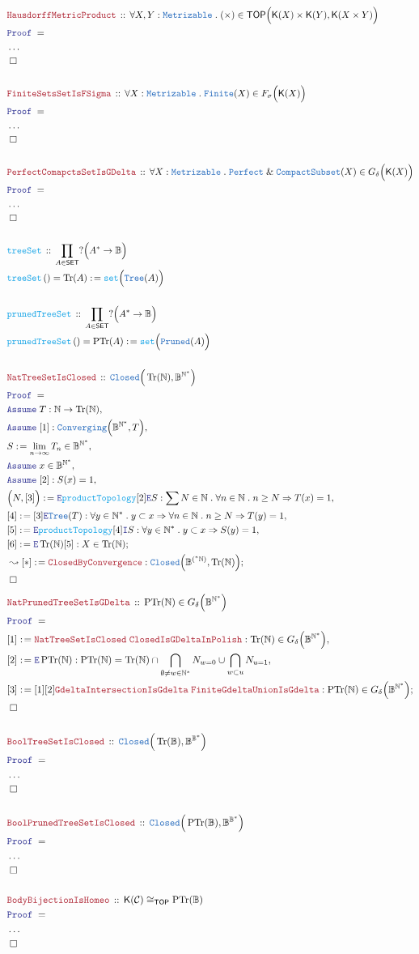 \documentclass[12pt]{scrartcl}
\newcommand{\TYPE}[1]{\textcolor{NavyBlue}{\mathtt{#1}}}
\newcommand{\FUNC}[1]{\textcolor{Cerulean}{\mathtt{#1}}}
\newcommand{\LOGIC}[1]{\textcolor{Blue}{\mathtt{#1}}}
\newcommand{\THM}[1]{\textcolor{Maroon}{\mathtt{#1}}}
\renewcommand{\.}{\; . \;}
\newcommand{\de}{: \kern 0.1pc =}
\newcommand{\Act}[1]{\left( #1 \right)}
\newcommand{\Theorem}[2]{& \THM{#1} \, :: \, #2 \\ & \Proof = \\ }
\newcommand{\DeclareFunc}[2]{& \FUNC{#1} \, :: \, #2 \\}
\newcommand{\DefineNamedFunc}[4]{&  \FUNC{#1}\Act{#2} = #3 \de #4 \\}
\newcommand{\Page}[1]{ \begin{align*} #1 \end{align*}   }
\newcommand{\NoProof}{ & \ldots \\ \EndProof}
\renewcommand{\And}{\; \& \;}
\newcommand{\Imply}{\Rightarrow}
\newcommand{\Intro}{\LOGIC{I}}
\newcommand{\Elim}{\LOGIC{E}}
\newcommand{\Nat}{\mathbb{N} }
\newcommand{\Say}[3]{& #1 \de #2 : #3, \\}
\newcommand{\SayIn}[3]{& #1 \de #2 \in #3, \\}
\newcommand{\Conclude}[3]{& #1 \de #2 : #3; \\}
\newcommand{\DeriveConclude}[3]{& \leadsto #1 \de #2 : #3 ; \\}
\newcommand{\Assume}[2]{& \LOGIC{Assume} \; #1 : #2, \\}
\newcommand{\AssumeIn}[2]{& \LOGIC{Assume} \; #1 \in #2, \\}
\newcommand{\QED}{\; \square}
\newcommand{\EndProof}{& \QED \\}
\newcommand{\Proof}{\LOGIC{Proof} \; }
\newcommand{\C}{\mathcal{C}}
\newcommand{\SET}{\mathsf{SET}}
\newcommand{\Compacts}{\TYPE{CompactSubset}}
\newcommand{\TOP}{\mathsf{TOP}}
\newcommand{\Bool}{\mathbb{B}}
\newcommand{\FS}[1]{{#1}{}^*}
\newcommand{\Tree}{\TYPE{Tree}}
\DeclareMathOperator{\Tr}{Tr}
\DeclareMathOperator{\PTr}{PTr}
\newcommand{\K}{\mathsf{K}}
\begin{document}
\Page{
	\Theorem{HausdorffMetricProduct}
	{
		\forall X,Y : \TYPE{Metrizable} \.
		(\times) \in \TOP\Big( \K(X) \times \K(Y), \K(X \times Y) \Big)
	}
	\NoProof
	\\
	\Theorem{FiniteSetsSetIsFSigma}
	{
		\forall X : \TYPE{Metrizable} \.
		\TYPE{Finite}(X) \in F_\sigma\Big( \K(X) \Big)
	}
	\NoProof
	\\
	\Theorem{PerfectComapctsSetIsGDelta}
	{
		\forall X : \TYPE{Metrizable} \.
		\TYPE{Perfect} \And \Compacts(X) \in G_\delta\Big( \K(X) \Big)
	}
	\NoProof
	\\
	\DeclareFunc{treeSet}{\prod_{A \in \SET} ?\Big(\FS{A}\to\mathbb{B}\Big)}
	\DefineNamedFunc{treeSet}{}{\Tr(A)}{\FUNC{set}\Big( \Tree(A) \Big)}
	\\
	\DeclareFunc{prunedTreeSet}{\prod_{A \in \SET} ?\Big(\FS{A}\to\mathbb{B}\Big)}
	\DefineNamedFunc{prunedTreeSet}{}{\PTr(A)}{\FUNC{set}\Big( \TYPE{Pruned}(A) \Big)}
	\\
	\Theorem{NatTreeSetIsClosed}{\TYPE{Closed}\Big( \Tr(\Nat), \mathbb{B}^{\FS{\Nat}}\Big)}
	\Assume{T}{\Nat \to \Tr(\Nat)}
	\Assume{[1]}{\TYPE{Converging}\Big( \Bool^{\FS{\Nat}} ,T \Big)}
	\SayIn{S}{\lim_{n \to \infty} T_n}{\Bool^{\FS{\Nat}}}
	\AssumeIn{x}{\Bool^{\FS{\Nat}}}
	\Assume{[2]}{S(x) = 1}
	\Say{\Big(N,[3]\Big)}
	{ \Elim \FUNC{productTopology}[2] \Elim S  }
	{
		\sum N \in \Nat \. \forall n \in \Nat \. n \ge N \Imply T(x) = 1
	}
	\Say{[4]}{[3]\Elim \Tree(T)}{ 
		\forall y \in \FS{\Nat} \. 
		y \subset x \Imply
		\forall n \in \Nat \. 
		n \ge N \Imply T(y) = 1
	}
	\Say{[5]}{\Elim \FUNC{productTopology}[4]\Intro S}
	{
		\forall y \in \FS{\Nat} \. y \subset x \Imply  S(y) = 1
	}
	\Conclude{[6]}{\Elim \Tr(\Nat)[5]}{X \in \Tr(\Nat)}
	\DeriveConclude{[*]}{\THM{ClosedByConvergence}}{\TYPE{Closed}\Big(\Bool^{\FS(\Nat)}, \Tr(\Nat) \Big)}
	\EndProof
}
\Page{
	\Theorem{NatPrunedTreeSetIsGDelta}
	{
		\PTr(\Nat) \in G_\delta\Big( \Bool^{\FS{\Nat}} \Big) 
	}
	\Say{[1]}{\THM{NatTreeSetIsClosed}\;\THM{ClosedIsGDeltaInPolish}}
	{
		\Tr(\Nat) \in G_\delta\Big( \Bool^{\FS{\Nat}} \Big)
	}
	\Say{[2]}{\Elim \PTr(\Nat)}
	{
		\PTr(\Nat) = \Tr(\Nat) \cap \bigcap_{\emptyset \neq w \in \FS{\Nat}} N_{w=0} \cup \bigcap_{w \subset u} N_{u=1}
	}
	\Conclude{[3]}{[1][2]\THM{GdeltaIntersectionIsGdelta}\;\THM{FiniteGdeltaUnionIsGdelta}}
	{
		\PTr(\Nat) \in G_\delta\Big( \Bool^{\FS{\Nat}} \Big)
	}
	\EndProof
	\\
	\Theorem{BoolTreeSetIsClosed}{\TYPE{Closed}\Big( \Tr(\Bool), \Bool^{\FS{\Bool}}\Big)}
	\NoProof
	\\
	\Theorem{BoolPrunedTreeSetIsClosed}{\TYPE{Closed}\Big( \PTr(\Bool), \Bool^{\FS{\Bool}}\Big)}
	\NoProof
	\\
	\Theorem{BodyBijectionIsHomeo}
	{
		\K(\C) \cong_\TOP \PTr(\Bool)
	}
	\NoProof
}
\newpage
\end{document}
